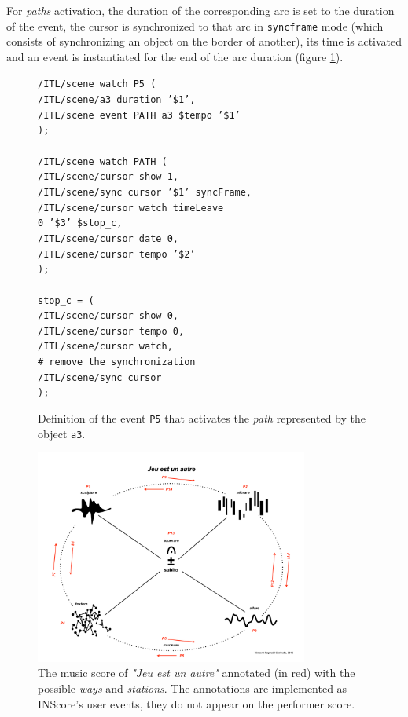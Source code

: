 \documentclass{article}
\newcommand{\OSC}[1]	{{\fontsize{8.5pt}{8pt} \selectfont\texttt{#1}}}
\newcommand{\tab}{\hspace*{4mm}}
\newcommand{\sample}[1]		{\vspace{-0.2em}\begin{center}\colorbox{mygrey}{\begin{minipage}[t]{0.98\columnwidth} {\small \texttt{#1}}\end{minipage}}\end{center}}
\begin{document}
For \emph{paths} activation, the duration of the corresponding arc is set to the duration of the event, the cursor is synchronized to that arc in \OSC{syncframe} mode (which consists of synchronizing an object on the border of another), its time is activated and an event is instantiated for the end of the arc duration (figure \ref{fig:path}).
\begin{figure}[h]
   \centering
\sample{/ITL/scene watch P5 ( \\
\tab/ITL/scene/a3 duration '\$1', \\
\tab/ITL/scene event PATH a3 \$tempo '\$1' \\
); \\
\\
/ITL/scene watch PATH ( \\
\tab/ITL/scene/cursor show 1,\\
\tab/ITL/scene/sync cursor '\$1' syncFrame,\\
\tab/ITL/scene/cursor watch timeLeave \\
\hspace*{30mm}0 '\$3' \$stop\_c,\\
\tab/ITL/scene/cursor date 0,\\
\tab/ITL/scene/cursor tempo '\$2'\\
); \\
\\
stop\_c = ( \\
\tab/ITL/scene/cursor show 0,\\
\tab/ITL/scene/cursor tempo 0, \\
\tab/ITL/scene/cursor watch,  \\
\tab\# remove the synchronization \\
\tab/ITL/scene/sync cursor \\
);
}
   \caption{Definition of the event \OSC{P5} that activates the \emph{path} represented by the object \OSC{a3}.}
   \label{fig:path}
\end{figure}

\begin{figure}[ht]
   \centering
   \includegraphics[width=0.8\textwidth]{imgs/jeu}
   \caption{The music score of \emph{"Jeu est un autre"} annotated (in red) with the possible \emph{ways} and \emph{stations}. The annotations are implemented as INScore's user events, they do not appear on the performer score.}
   \label{fig:sample}
\end{figure}
\end{document}
